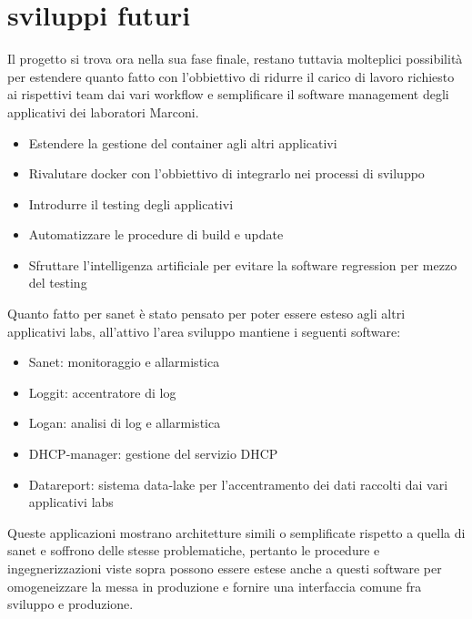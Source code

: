 \chapter{sviluppi futuri}

Il progetto si trova ora nella sua fase finale, restano tuttavia molteplici possibilità per estendere quanto fatto con l'obbiettivo di ridurre il carico di lavoro richiesto ai rispettivi team dai vari workflow e semplificare il software management degli applicativi dei laboratori Marconi.

\begin{itemize}
  \item{Estendere la gestione del container agli altri applicativi}
  \item{Rivalutare docker con l'obbiettivo di integrarlo nei processi di sviluppo}
  \item{Introdurre il testing degli applicativi}
  \item{Automatizzare le procedure di build e update}
  \item{Sfruttare l'intelligenza artificiale per evitare la software regression per mezzo del testing}
\end{itemize}

Quanto fatto per sanet è stato pensato per poter essere esteso agli altri applicativi labs, all'attivo l'area sviluppo mantiene i seguenti software:

\begin{itemize}
  \item{Sanet: monitoraggio e allarmistica}
  \item{Loggit: accentratore di log}
  \item{Logan: analisi di log e allarmistica}
  \item{DHCP-manager: gestione del servizio DHCP}
  \item{Datareport: sistema data-lake per l'accentramento dei dati raccolti dai vari applicativi labs}
\end{itemize}

Queste applicazioni mostrano architetture simili o semplificate rispetto a quella di sanet e soffrono delle stesse problematiche, pertanto le procedure e ingegnerizzazioni viste sopra possono essere estese anche a questi software per omogeneizzare la messa in produzione e fornire una interfaccia comune fra sviluppo e produzione.

